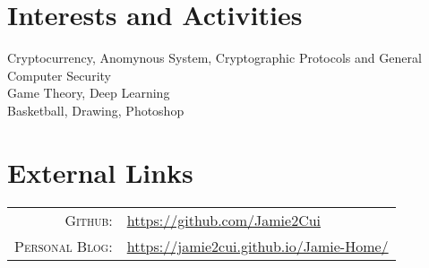 \documentclass[a4paper,10pt]{article}
\begin{document}
\section{Interests and Activities}
Cryptocurrency, Anomynous System, Cryptographic Protocols and General Computer Security\\
Game Theory, Deep Learning\\
Basketball, Drawing, Photoshop

\section{External Links}
\begin{tabular}{rl}
    \textsc{Github:}    & \href{https://github.com/Jamie2Cui}{https://github.com/Jamie2Cui}\\
    \textsc{Personal Blog:}& \href{https://jamie2cui.github.io/Jamie-Home/}{https://jamie2cui.github.io/Jamie-Home/}
\end{tabular}

		
		
\end{document}
